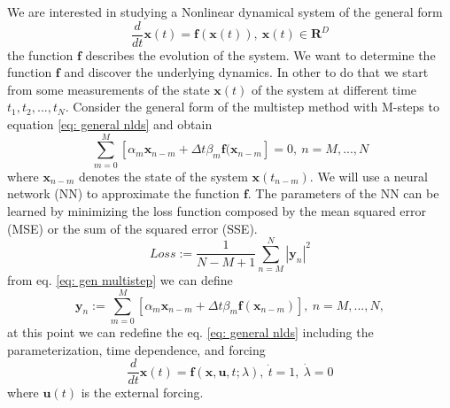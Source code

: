 We are interested in studying a Nonlinear dynamical system of the general form
\begin{equation}\label{eq: general nlds}
    \frac{d}{dt}\boldsymbol{x}(t)=\boldsymbol{f}(\boldsymbol{x}(t)), \ \boldsymbol{x}(t)\in\mathbf{R}^D
\end{equation}
the function $\boldsymbol{f}$ describes the evolution of the system. 
We want to determine the function $\boldsymbol{f}$ and discover the underlying dynamics. In other to do that we start from some measurements of the state $\boldsymbol{x}(t)$ of the system at different time $t_1,t_2,...,t_N$.
Consider the general form of the multistep method with M-steps to equation \ref{eq: general nlds} and obtain
\begin{equation}\label{eq: gen multistep}
\sum_{m=0}^M[\alpha_m\boldsymbol{x}_{n-m}+\Delta t \beta_m\boldsymbol{f}(\boldsymbol{x}_{n-m}]=0, \ n=M,...,N
\end{equation}
where $\boldsymbol{x}_{n-m}$ denotes the state of the system $\boldsymbol{x}(t_{n-m})$.
We will use a neural network (NN) to approximate the function $\boldsymbol{f}$. The parameters of the NN can be learned by minimizing the loss function composed by the mean squared error (MSE) or the sum of the squared error (SSE).
\begin{equation}\label{eq: general loss}
   Loss:=\frac{1}{N-M+1}\sum_{n=M}^N|\boldsymbol{y}_n|^2
\end{equation}
from eq. \eqref{eq: gen multistep} we can define
\begin{equation}\label{eq: gen itearation}
\boldsymbol{y}_n:=\sum_{m=0}^M[\alpha_m\boldsymbol{x}_{n-m}+\Delta t \beta_m\boldsymbol{f}(\boldsymbol{x}_{n-m})], \ n=M,...,N,
\end{equation}
at this point we can redefine the eq. \eqref{eq: general nlds} including the parameterization, time dependence, and forcing
\begin{equation*}
    \frac{d}{dt}\boldsymbol{x}(t)=\boldsymbol{f}(\boldsymbol{x},\boldsymbol{u},t;\lambda), 
 \ \Dot{t}=1, \ \Dot{\lambda}=0
\end{equation*}
where $\boldsymbol{u}(t)$ is the external forcing.

